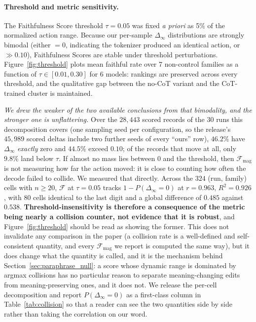 \documentclass{article}
\begin{document}
\paragraph{Threshold and metric sensitivity.} The Faithfulness Score threshold $\tau = 0.05$ was fixed \emph{a priori} as 5\% of the normalized action range. Because our per-sample $\Delta_\infty$ distributions are strongly bimodal (either $=0$, indicating the tokenizer produced an identical action, or $\gg 0.10$), Faithfulness Scores are stable under threshold perturbations. Figure~\ref{fig:threshold} plots mean faithful rate over 7 non-control families as a function of $\tau \in [0.01, 0.30]$ for 6 models: rankings are preserved across every threshold, and the qualitative gap between the no-CoT variant and the CoT-trained cluster is maintained.

\emph{We drew the weaker of the two available conclusions from that bimodality, and the stronger one is unflattering.} Over the $28{,}443$ scored records of the 30 runs this decomposition covers (one sampling seed per configuration, so the release's $45{,}989$ scored deltas include two further seeds of every ``ours'' row), $46.2\%$ have $\Delta_\infty$ \emph{exactly} zero and $44.5\%$ exceed $0.10$; of the records that move at all, only $9.8\%$ land below $\tau$. If almost no mass lies between $0$ and the threshold, then $\mathcal{F}_{\text{mag}}$ is not measuring how far the action moved: it is close to counting how often the decode failed to collide. We measured that directly. Across the $324$ (run, family) cells with $n \geq 20$, $\mathcal{F}$ at $\tau{=}0.05$ tracks $1 - P(\Delta_\infty = 0)$ at $r = 0.963$, $R^2 = 0.926$, with $80$ cells identical to the last digit and a global difference of $0.485$ against $0.538$. \textbf{Threshold-insensitivity is therefore a consequence of the metric being nearly a collision counter, not evidence that it is robust}, and Figure~\ref{fig:threshold} should be read as showing the former. This does not invalidate any comparison in the paper (a collision rate is a well-defined and self-consistent quantity, and every $\mathcal{F}_{\text{mag}}$ we report is computed the same way), but it does change what the quantity is called, and it is the mechanism behind Section~\ref{sec:paraphrase_null}: a score whose dynamic range is dominated by argmax collisions has no particular reason to separate meaning-changing edits from meaning-preserving ones, and it does not. We release the per-cell decomposition and report $P(\Delta_\infty = 0)$ as a first-class column in Table~\ref{tab:collision} so that a reader can see the two quantities side by side rather than taking the correlation on our word.
\end{document}
